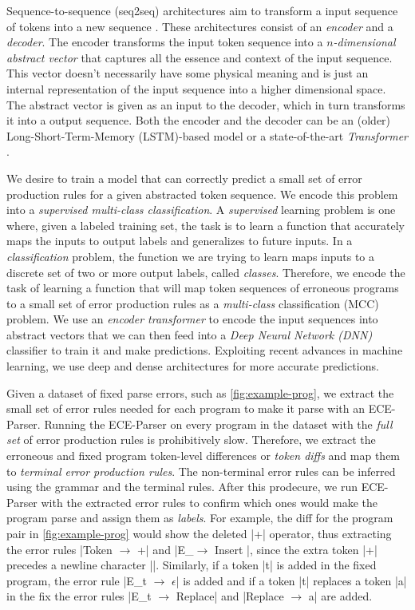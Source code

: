 Sequence-to-sequence (seq2seq) architectures aim to transform a input sequence
of tokens into a new sequence \citep{Sutskever_2014}. These architectures
consist of an \emph{encoder} and a \emph{decoder}. The encoder transforms the
input token sequence into a \emph{$n$-dimensional abstract vector} that captures
all the essence and context of the input sequence. This vector doesn't
necessarily have some physical meaning and is just an internal representation of
the input sequence into a higher dimensional space. The abstract vector is given
as an input to the decoder, which in turn transforms it into a output sequence.
Both the encoder and the decoder can be an (older) Long-Short-Term-Memory
(LSTM)-based model \citep{Hochreiter_1997} or a state-of-the-art
\emph{Transformer} \citep{Vaswani_2017}.

We desire to train a model that can correctly predict a small set of error
production rules for a given abstracted token sequence. We encode this problem
into a \emph{supervised multi-class classification}. A \emph{supervised}
learning problem is one where, given a labeled training set, the task is to
learn a function that accurately maps the inputs to output labels and
generalizes to future inputs. In a \emph{classification} problem, the function
we are trying to learn maps inputs to a discrete set of two or more output
labels, called \emph{classes}. Therefore, we encode the task of learning a
function that will map token sequences of erroneous programs to a small set of
error production rules as a \emph{multi-class} classification (MCC) problem. We
use an \emph{encoder transformer} to encode the input sequences into abstract
vectors that we can then feed into a \emph{Deep Neural Network (DNN)} classifier
to train it and make predictions. Exploiting recent advances in machine
learning, we use deep and dense architectures \citep{Schmidhuber_2015} for more
accurate predictions.

Given a dataset of fixed parse errors, such as \autoref{fig:example-prog}, we
extract the small set of error rules needed for each program to make it parse
with an ECE-Parser. Running the ECE-Parser on every program in the dataset with
the \emph{full set} of error production rules is prohibitively slow. Therefore,
we extract the erroneous and fixed program token-level differences or
\emph{token diffs} and map them to \emph{terminal error production rules}. The
non-terminal error rules can be inferred using the grammar and the terminal
rules. After this prodecure, we run ECE-Parser with the extracted error rules to
confirm which ones would make the program parse and assign them as
\emph{labels}. For example, the diff for the program pair in
\autoref{fig:example-prog} would show the deleted |+| operator, thus extracting
the error rules |Token $\rightarrow$ +| and |E_\n $\rightarrow$ Insert \n|,
since the extra token |+| precedes a newline character |\n|. Similarly, if a
token |t| is added in the fixed program, the error rule
%
|E_t $\rightarrow$ $\epsilon$| is added and if a token |t| replaces a token |a|
in the fix the error rules |E_t $\rightarrow$ Replace| and
%
|Replace $\rightarrow$ a| are added.


